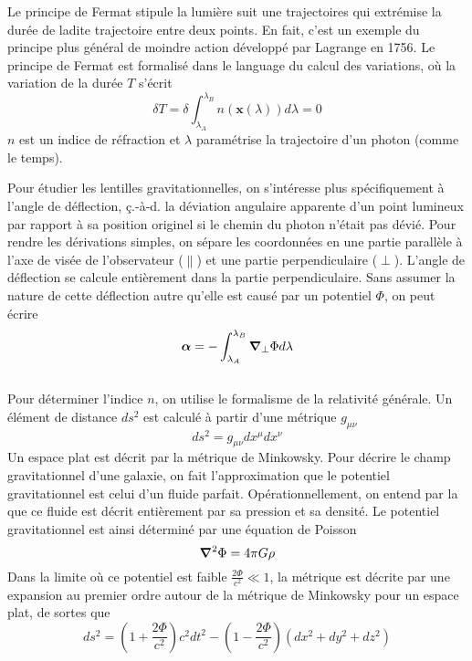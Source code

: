 Le principe de Fermat stipule la lumière suit une trajectoires qui extrémise
la durée de ladite trajectoire entre deux points. 
En fait, c'est un exemple du principe 
plus général de moindre action développé par Lagrange en 1756. 
Le principe de Fermat est formalisé dans le language du calcul 
des variations, où la variation de la durée $T$ s'écrit
\begin{equation}\label{eq:Fermat}
       \delta T =  \delta \int_{\lambda_A}^{\lambda_B} n(\mathbf{x}(\lambda))d\lambda = 0 
\end{equation} 
$n$ est un indice de réfraction et $\lambda$ paramétrise la trajectoire d'un photon 
(comme le temps).

Pour étudier les lentilles gravitationnelles, on s'intéresse plus spécifiquement à l'angle 
de déflection, ç.-à-d. la déviation angulaire apparente d'un point 
lumineux par rapport à sa position originel si 
le chemin du photon n'était pas dévié. Pour rendre les dérivations simples, 
on sépare les coordonnées en une partie parallèle à l'axe de visée de l'observateur ($\parallel$) 
et une partie perpendiculaire ($\perp$). L'angle de déflection se calcule entièrement 
dans la partie perpendiculaire. Sans assumer la nature de cette déflection autre 
qu'elle est causé par un potentiel $\Phi$, on 
peut écrire
\begin{equation}\label{eq:alpha}
       \boldsymbol{ \alpha} = - \int_{\lambda_A}^{\lambda_B} \grad_{\perp}\Phi d\lambda
\end{equation} 

\begin{equation}\label{eq:deflection true}
\end{equation} 


Pour déterminer l'indice $n$, on utilise le formalisme de la relativité 
générale. Un élément de distance $ds^2$ est calculé à partir d'une métrique $g_{\mu \nu}$ 
\begin{equation}\label{eq:ds}
        ds^2 = g_{\mu \nu}dx^{\mu}dx^{\nu}
\end{equation} 
Un espace plat est décrit par la métrique de Minkowsky. Pour décrire le champ 
gravitationnel d'une galaxie, on fait l'approximation que le potentiel gravitationnel 
est celui d'un fluide parfait. Opérationnellement, on entend par la que ce fluide est décrit entièrement 
par sa pression et sa densité. Le potentiel gravitationnel est ainsi déterminé 
par une équation de Poisson 
\begin{equation}\label{eq:Poisson}
       \grad^{2}\Phi = 4\pi G \rho 
\end{equation} 
Dans la limite où ce potentiel est faible $\displaystyle \frac{2\Phi}{c^{2}} \ll 1$, la 
métrique est décrite par une expansion au premier ordre autour de la 
métrique de Minkowsky pour un espace plat, de sortes que
\begin{equation}\label{eq:newton}
        ds^2 = \left( 1 + \frac{2\Phi}{c^{2}} \right)c^{2}dt^{2} - \left( 1 - \frac{2\Phi}{c^{2}} \right)(dx^{2} + dy^{2} + dz^{2})
\end{equation} 

